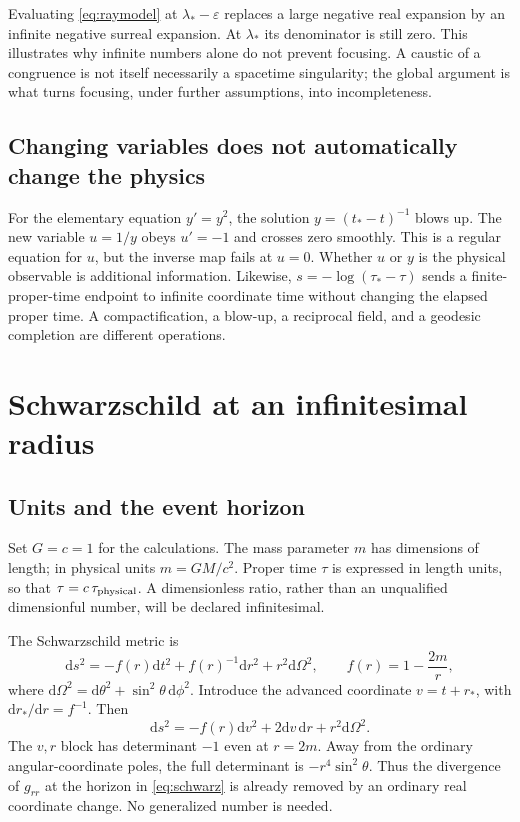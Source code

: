 \documentclass[11pt,a4paper]{article}
\numberwithin{equation}{section}
\theoremstyle{definition}
\theoremstyle{remark}
\newcommand{\dd}{\mathrm d}
\begin{document}
Evaluating \eqref{eq:raymodel} at $\lambda_* -\varepsilon$ replaces a large
negative real expansion by an infinite negative surreal expansion. At
$\lambda_*$ its denominator is still zero. This illustrates why infinite
numbers alone do not prevent focusing. A caustic of a congruence is not itself
necessarily a spacetime singularity; the global argument is what turns
focusing, under further assumptions, into incompleteness.

\subsection{Changing variables does not automatically change the physics}
For the elementary equation $y'=y^2$, the solution $y=(t_*-t)^{-1}$ blows up.
The new variable $u=1/y$ obeys $u'=-1$ and crosses zero smoothly. This is a
regular equation for $u$, but the inverse map fails at $u=0$. Whether $u$ or $y$
is the physical observable is additional information. Likewise,
$s=-\log(\tau_* -\tau)$ sends a finite-proper-time endpoint to infinite
coordinate time without changing the elapsed proper time. A compactification,
a blow-up, a reciprocal field, and a geodesic completion are different
operations.

\section{Schwarzschild at an infinitesimal radius}\label{sec:schwarzschild}

\subsection{Units and the event horizon}
Set $G=c=1$ for the calculations. The mass parameter $m$ has dimensions of
length; in physical units $m=GM/c^2$. Proper time $\tau$ is expressed in length
units, so that $\tau=c\,\tau_{\rm physical}$. A dimensionless ratio, rather
than an unqualified dimensionful number, will be declared infinitesimal.

The Schwarzschild metric is
\begin{equation}\label{eq:schwarz}
\dd s^2=-f(r)\dd t^2+f(r)^{-1}\dd r^2+r^2\dd\Omega^2,
\qquad f(r)=1-\frac{2m}{r},
\end{equation}
where $\dd\Omega^2=\dd\theta^2+\sin^2\theta\,\dd\phi^2$. Introduce the
advanced coordinate $v=t+r_*$, with $\dd r_*/\dd r=f^{-1}$. Then
\begin{equation}\label{eq:ef}
\dd s^2=-f(r)\dd v^2+2\dd v\,\dd r+r^2\dd\Omega^2.
\end{equation}
The $v,r$ block has determinant $-1$ even at $r=2m$. Away from the ordinary
angular-coordinate poles, the full determinant is $-r^4\sin^2\theta$.
Thus the divergence of $g_{rr}$ at the horizon in \eqref{eq:schwarz} is already
removed by an ordinary real coordinate change. No generalized number is needed.
\end{document}

